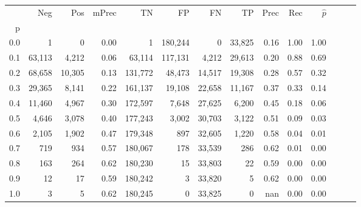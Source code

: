 \begin{tabular}{rrrrrrrrrrrrrr}
\toprule
{} &     Neg &     Pos & mPrec &       TN &       FP &      FN &      TP &  Prec &   Rec & $\hat{p}$ \\
p   &         &         &       &          &          &         &         &       &       &           \\
\midrule
0.0 &       1 &       0 &  0.00 &        1 &  180,244 &       0 &  33,825 &  0.16 &  1.00 &      1.00 \\
0.1 &  63,113 &   4,212 &  0.06 &   63,114 &  117,131 &   4,212 &  29,613 &  0.20 &  0.88 &      0.69 \\
0.2 &  68,658 &  10,305 &  0.13 &  131,772 &   48,473 &  14,517 &  19,308 &  0.28 &  0.57 &      0.32 \\
0.3 &  29,365 &   8,141 &  0.22 &  161,137 &   19,108 &  22,658 &  11,167 &  0.37 &  0.33 &      0.14 \\
0.4 &  11,460 &   4,967 &  0.30 &  172,597 &    7,648 &  27,625 &   6,200 &  0.45 &  0.18 &      0.06 \\
0.5 &   4,646 &   3,078 &  0.40 &  177,243 &    3,002 &  30,703 &   3,122 &  0.51 &  0.09 &      0.03 \\
0.6 &   2,105 &   1,902 &  0.47 &  179,348 &      897 &  32,605 &   1,220 &  0.58 &  0.04 &      0.01 \\
0.7 &     719 &     934 &  0.57 &  180,067 &      178 &  33,539 &     286 &  0.62 &  0.01 &      0.00 \\
0.8 &     163 &     264 &  0.62 &  180,230 &       15 &  33,803 &      22 &  0.59 &  0.00 &      0.00 \\
0.9 &      12 &      17 &  0.59 &  180,242 &        3 &  33,820 &       5 &  0.62 &  0.00 &      0.00 \\
1.0 &       3 &       5 &  0.62 &  180,245 &        0 &  33,825 &       0 &   nan &  0.00 &      0.00 \\
\bottomrule
\end{tabular}
